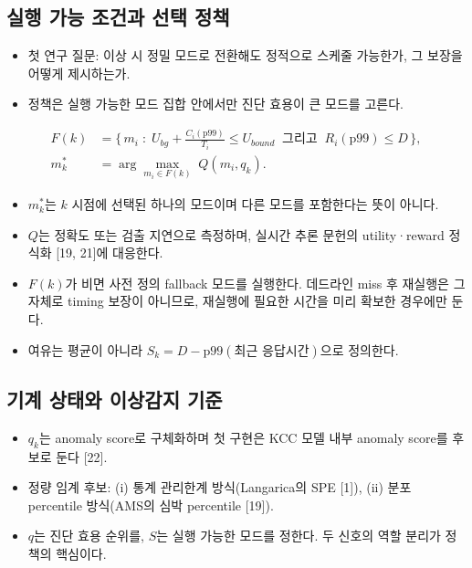 \documentclass[10pt]{article}
\begin{document}
\subsection{실행 가능 조건과 선택 정책}
\begin{itemize}
\item 첫 연구 질문: 이상 시 정밀 모드로 전환해도 정적으로 스케줄 가능한가, 그 보장을 어떻게 제시하는가.
\item 정책은 실행 가능한 모드 집합 안에서만 진단 효용이 큰 모드를 고른다.
\end{itemize}
\begin{align}
F(k) &= \Big\{\, m_i \;:\; U_{bg}+\tfrac{C_i(\mathrm{p99})}{T_i}\le U_{bound}\ \text{ 그리고 }\ R_i(\mathrm{p99})\le D \,\Big\},\\
m^{*}_k &= \arg\max_{m_i \in F(k)}\; Q(m_i, q_k).
\end{align}
\begin{itemize}
\item $m^{*}_k$는 $k$ 시점에 선택된 하나의 모드이며 다른 모드를 포함한다는 뜻이 아니다.
\item $Q$는 정확도 또는 검출 지연으로 측정하며, 실시간 추론 문헌의 utility·reward 정식화 [19, 21]에 대응한다.
\item $F(k)$가 비면 사전 정의 fallback 모드를 실행한다. 데드라인 miss 후 재실행은 그 자체로 timing 보장이 아니므로, 재실행에 필요한 시간을 미리 확보한 경우에만 둔다.
\item 여유는 평균이 아니라 $S_k=D-\mathrm{p99}(\text{최근 응답시간})$으로 정의한다.
\end{itemize}

\subsection{기계 상태와 이상감지 기준}
\begin{itemize}
\item $q_k$는 anomaly score로 구체화하며 첫 구현은 KCC 모델 내부 anomaly score를 후보로 둔다 [22].
\item 정량 임계 후보: (i) 통계 관리한계 방식(Langarica의 SPE [1]), (ii) 분포 percentile 방식(AMS의 심박 percentile [19]).
\item $q$는 진단 효용 순위를, $S$는 실행 가능한 모드를 정한다. 두 신호의 역할 분리가 정책의 핵심이다.
\end{itemize}
\end{document}
